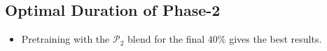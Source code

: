 \documentclass[11pt]{article}
\newcommand{\todo}[1]{{\color{red}\bf [TODO: #1]}\xspace}
\newcommand{\steven}[1]{\textcolor{magenta}{\bf\small [Steven: #1]}\xspace}
\newcommand{\phasetwo}{$\mathcal{P}_2$\xspace}
\begin{document}












\subsection{Optimal Duration of Phase-2}
\label{subsec:pct-upsampling}

\begin{tcolorbox}[colframe=black!80, colback=gray!10, coltitle=white, title=Insights, fonttitle=\bfseries]
\begin{itemize}
\item Pretraining with the \phasetwo blend for the final 40\% gives the best results.
\end{itemize}
\end{tcolorbox}
\end{document}
